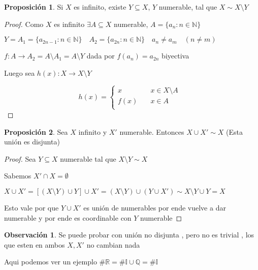 \documentclass[12pt]{article}
\newcommand{\Q}{\mathbb{Q}}
\newcommand{\R}{\mathbb{R}}
\newcommand{\I}{\mathbb{I}}
\newcommand{\N}{\mathbb{N}}
\newcommand{\ra}{\rightarrow}
\theoremstyle{definition}
\newtheorem*{remark}{Observación}
\newtheorem{prop}{Proposición}
\begin{document}
\begin{prop}
  Si $X$ es infinito, existe $Y \subseteq X$, $ Y$ numerable, tal que $X \sim X \setminus Y$

  \begin{proof}
  Como $X$ es infinito $\exists A \subseteq X$ numerable, $A = \{a_{n}: n \in \N\}$

  $Y = A_{1} = \{a_{2n -1} : n \in \N \} \quad A_{2} = \{a_{2n} : n \in \N \} \quad a_{n} \neq a_{m} \quad (n \neq m)$ 

  $f : A \ra A_{2} = A \setminus A_{1} = A \setminus Y$ dada por $f(a_{n}) = a_{2n}$ biyectiva 

  Luego sea $h(x): X \ra X \setminus Y$ 

\[
h(x) =
     \begin{cases}
       \text{$x$} &\quad\text{$x \in X \setminus A$ }\\
       \text{$f(x)$} &\quad\text{$x \in A$} \\
     \end{cases}
\]

  \end{proof}
\end{prop}


\begin{prop}
  Sea $X$ infinito y $X'$ numerable. Entonces $X \cup X' \sim X$ (Esta unión es disjunta)

  \begin{proof}
   Sea $Y \subseteq X$ numerable tal que $X \setminus Y \sim X$

  Sabemos $X' \cap X = \emptyset$ 

  $X \cup X' = [(X \setminus Y) \cup Y ] \cup X' = (X \setminus Y) \cup (Y \cup X') \sim X \setminus Y \cup Y = X$

  Esto vale por que $Y \cup X'$ es unión de numerables por ende vuelve a dar numerable y por ende es coordinable con $Y$ numerable
   
   
  \end{proof}

  \begin{remark}
    Se puede probar con unión no disjunta , pero no es trivial , los que esten en ambos $X, X'$ no cambian nada
  
    Aqui podemos ver un ejemplo $\# \R = \# \I \cup \Q = \# \I$

  \end{remark}
\end{prop}
\end{document}
